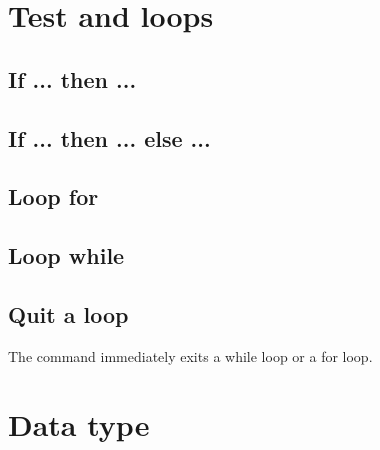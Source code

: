 \documentclass[11pt,class=report,crop=false]{standalone}
\begin{document}



\section{Test and loops}

\subsection{If ... then ...}

\subsection{If ... then ... else ... }


\subsection{Loop for}


\subsection{Loop while}


\subsection{Quit a loop}

The command  immediately exits a \og{}while\fg{} loop
or a \og{}for\fg{} loop.



\section{Data type}
\end{document}
